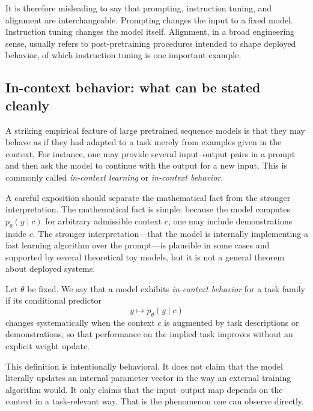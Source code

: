 It is therefore misleading to say that prompting, instruction tuning, and alignment are interchangeable.
Prompting changes the input to a fixed model.
Instruction tuning changes the model itself.
Alignment, in a broad engineering sense, usually refers to post-pretraining procedures intended to shape deployed behavior, of which instruction tuning is one important example.

\subsection*{In-context behavior: what can be stated cleanly}

A striking empirical feature of large pretrained sequence models is that they may behave as if they had adapted to a task merely from examples given in the context.
For instance, one may provide several input--output pairs in a prompt and then ask the model to continue with the output for a new input.
This is commonly called \emph{in-context learning} or \emph{in-context behavior}.

A careful exposition should separate the mathematical fact from the stronger interpretation.
The mathematical fact is simple: because the model computes $p_{\theta}(y\mid c)$ for arbitrary admissible context $c$, one may include demonstrations inside $c$.
The stronger interpretation---that the model is internally implementing a fast learning algorithm over the prompt---is plausible in some cases and supported by several theoretical toy models, but it is not a general theorem about deployed systems.

\begin{definition}
Let $\theta$ be fixed.
We say that a model exhibits \emph{in-context behavior} for a task family if its conditional predictor
\[
y \mapsto p_{\theta}(y \mid c)
\]
changes systematically when the context $c$ is augmented by task descriptions or demonstrations, so that performance on the implied task improves without an explicit weight update.
\end{definition}

This definition is intentionally behavioral.
It does not claim that the model literally updates an internal parameter vector in the way an external training algorithm would.
It only claims that the input--output map depends on the context in a task-relevant way.
That is the phenomenon one can observe directly.

